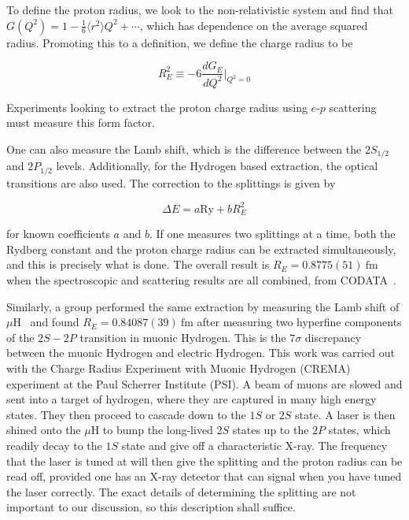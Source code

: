 To define the proton radius, we look to the non-relativistic system and find that $G(Q^2) = 1 - \frac{1}{6}\langle r^2 \rangle Q^2 + \cdots$, which has dependence on the average squared radius.
Promoting this to a definition, we define the charge radius to be

\begin{equation}
    R_E^2 \equiv -6 \frac{d G_E}{d Q^2}\rvert_{Q^2=0}
\end{equation}

\noindent Experiments looking to extract the proton charge radius using $e\textrm{-}p$ scattering must measure this form factor.

One can also measure the Lamb shift, which is the difference between the $2S_{1/2}$ and $2P_{1/2}$ levels.
Additionally, for the Hydrogen based extraction, the optical transitions are also used.
The correction to the splittings is given by

\begin{equation}
    \Delta E = a \textrm{Ry} + b R_E^2
\end{equation}

\noindent for known coefficients $a$ and $b$.
If one measures two splittings at a time, both the Rydberg constant and the proton charge radius can be extracted simultaneously, and this is precisely what is done.
The overall result is $R_E = 0.8775(51)~\textrm{fm}$ when the spectroscopic and scattering results are all combined, from CODATA~\cite{Mohr:2012tt}.

Similarly, a group performed the same extraction by measuring the Lamb shift of $\mu\textrm{H}$~\cite{Pohl:2010zza,Antognini:1900ns} and found $R_E = 0.84087(39)~\textrm{fm}$ after measuring two hyperfine components of the $2S-2P$ transition in muonic Hydrogen.
This is the $7\sigma$ discrepancy between the muonic Hydrogen and electric Hydrogen.
This work was carried out with the Charge Radius Experiment with Muonic Hydrogen (CREMA) experiment at the Paul Scherrer Institute (PSI).
A beam of muons are slowed and sent into a target of hydrogen, where they are captured in many high energy states.
They then proceed to cascade down to the $1S$ or $2S$ state.
A laser is then shined onto the $\mu\textrm{H}$ to bump the long-lived $2S$ states up to the $2P$ states, which readily decay to the $1S$ state and give off a characteristic X-ray.
The frequency that the laser is tuned at will then give the splitting and the proton radius can be read off, provided one has an X-ray detector that can signal when you have tuned the laser correctly.
The exact details of determining the splitting are not important to our discussion, so this description shall suffice.

